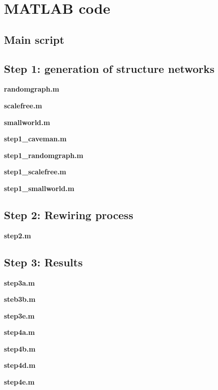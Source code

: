 \section{MATLAB code}
\subsection{Main script}



\subsection{Step 1: generation of structure networks}

\textbf{randomgraph.m}


\textbf{scalefree.m}



\textbf{smallworld.m}



\textbf{step1\_caveman.m}



\textbf{step1\_randomgraph.m}



\textbf{step1\_scalefree.m}



\textbf{step1\_smallworld.m}



\subsection{Step 2: Rewiring process}

\textbf{step2.m}



\subsection{Step 3: Results}

\textbf{step3a.m}



\textbf{steb3b.m}



\textbf{step3e.m}



\textbf{step4a.m}



\textbf{step4b.m}



\textbf{step4d.m}



\textbf{step4e.m}



